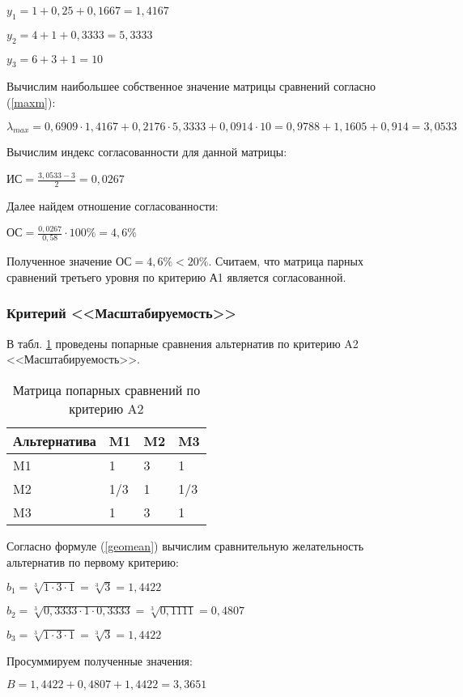 $y_1 = 1 + 0,25 + 0,1667 = 1,4167$

$y_2 = 4 + 1 + 0,3333 = 5,3333$

$y_3 = 6 + 3 + 1 = 10$

Вычислим наибольшее собственное значение матрицы сравнений согласно (\ref{maxm}):

$\lambda_{max} = 0,6909 \cdot 1,4167 + 0,2176 \cdot 5,3333 + 0,0914 \cdot 10 = 0,9788 + 1,1605 + 0,914 = 3,0533$

Вычислим индекс согласованности для данной матрицы:

$\text{ИС} = \frac{3,0533 - 3}{2} = 0,0267$

Далее найдем отношение согласованности:

$\text{ОС} = \frac{0,0267}{0,58} \cdot 100\% = 4,6\%$

Полученное значение $\text{ОС} = 4,6\% < 20\%$.
Считаем, что матрица парных сравнений третьего уровня по критерию А1 является согласованной.

\subsubsection{Критерий <<Масштабируемость>>}

В табл. \ref{agil} проведены попарные сравнения альтернатив по критерию A2 <<Масштабируемость>>.
\begin{table}[H]
  \caption{Матрица попарных сравнений по критерию A2}\label{agil}
  \begin{tabular}{|l|l|l|l|}
  \hline Альтернатива & M1 & M2 & M3 \\
  \hline M1 & 1 & 3 & 1 \\
  \hline M2 & 1/3 & 1 & 1/3 \\
  \hline M3 & 1 & 3 & 1 \\
  \hline
  \end{tabular}
\end{table}

Согласно формуле (\ref{geomean}) вычислим сравнительную желательность альтернатив по первому критерию:

$b_1 = \sqrt[3]{1 \cdot 3 \cdot 1} = \sqrt[3]{3} = 1,4422$

$b_2 = \sqrt[3]{0,3333 \cdot 1 \cdot 0,3333} = \sqrt[3]{0,1111} = 0,4807$

$b_3 = \sqrt[3]{1 \cdot 3 \cdot 1} = \sqrt[3]{3} = 1,4422$

Просуммируем полученные значения:

$B = 1,4422 + 0,4807 + 1,4422 = 3,3651$

